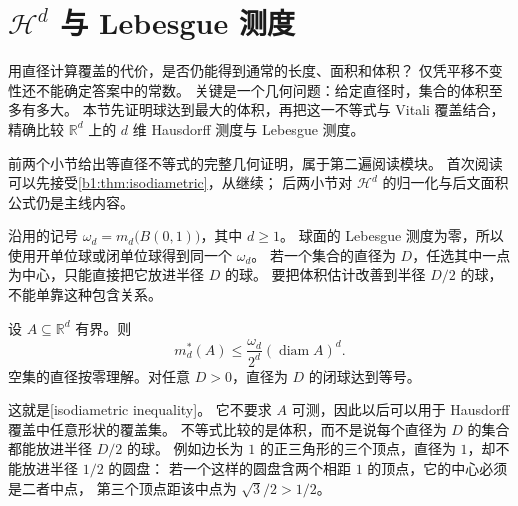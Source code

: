 \section{\texorpdfstring{\(\mathcal H^d\)}{Hd} 与 Lebesgue 测度}
\label{b1:sec:1503}


用直径计算覆盖的代价，是否仍能得到通常的长度、面积和体积？
仅凭平移不变性还不能确定答案中的常数。
关键是一个几何问题：给定直径时，集合的体积至多有多大。
本节先证明球达到最大的体积，再把这一不等式与 Vitali 覆盖结合，
精确比较 \(\mathbb R^d\) 上的 \(d\) 维 Hausdorff 测度与 Lebesgue 测度。

\ProseParagraphBreak

前两个小节给出等直径不等式的完整几何证明，属于第二遍阅读模块。
首次阅读可以先接受\cref{b1:thm:isodiametric}，从继续；
后两小节对 \(\mathcal H^d\) 的归一化与后文面积公式仍是主线内容。


沿用的记号
\(\omega_d=m_d\bigl(B(0,1)\bigr)\)，其中 \(d\geq1\)。
球面的 Lebesgue 测度为零，所以使用开单位球或闭单位球得到同一个 \(\omega_d\)。
若一个集合的直径为 \(D\)，任选其中一点为中心，只能直接把它放进半径 \(D\) 的球。
要把体积估计改善到半径 \(D/2\) 的球，不能单靠这种包含关系。

\begin{theorem}[等直径不等式]\label{b1:thm:isodiametric}
设 \(A\subseteq\mathbb R^d\) 有界。则
\begin{equation}\label{b1:eq:isodiametric}
 m_d^*(A)\leq\frac{\omega_d}{2^d}
                  (\operatorname{diam}A)^d.
\end{equation}
空集的直径按零理解。对任意 \(D>0\)，直径为 \(D\) 的闭球达到等号。
\end{theorem}

这就是[isodiametric inequality]。
它不要求 \(A\) 可测，因此以后可以用于 Hausdorff 覆盖中任意形状的覆盖集。
不等式比较的是体积，而不是说每个直径为 \(D\) 的集合都能放进半径 \(D/2\) 的球。
例如边长为 \(1\) 的正三角形的三个顶点，直径为 \(1\)，却不能放进半径 \(1/2\) 的圆盘：
若一个这样的圆盘含两个相距 \(1\) 的顶点，它的中心必须是二者中点，
第三个顶点距该中点为 \(\sqrt3/2>1/2\)。

